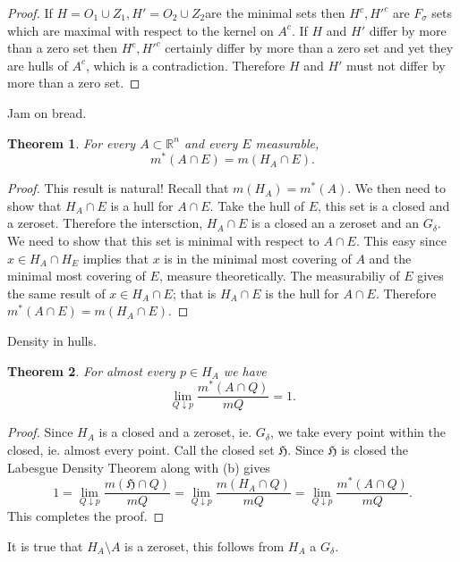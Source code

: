 \documentclass[letter]{article}
\newtheorem{theorem}{Theorem}
\newenvironment{menumerate}{%
  \edef\backupindent{\the\parindent}%
  \enumerate%
  \setlength{\parindent}{\backupindent}%
}{\endenumerate}
\begin{document}
\begin{menumerate}
\begin{menumerate}
\begin{proof}
			If $H = O_1 \cup Z_1, H' = O_2 \cup Z_2$are the minimal sets then $H^c, {H'}^c$ are $F_\sigma$ sets which are maximal with respect to the kernel on $A^c$.  If $H$ and $H'$ differ by more than a zero set then $H^c, {H'}^c$ certainly differ by more than a zero set and yet they are hulls of $A^c$, which is a contradiction. Therefore $H$ and $H'$ must not differ by more than a zero set.
		\end{proof}
		\item Jam on bread.
		\begin{theorem}
			For every $A  \subset \mathbb{R}^n$ and every $E$ measurable,
			\begin{equation}
			 	m^*(A \cap E) = m(H_A \cap E).
			 \end{equation} 
		\end{theorem}
		\begin{proof}
			This result is natural! Recall that $m(H_A) = m^*(A).$ We then need to show that $H_A \cap E$ is a hull for $A \cap E.$
			Take the hull of $E$, this set is a closed and a zeroset. 
			Therefore the intersction, $H_A \cap E$ is a closed an a zeroset and an $G_\delta.$ We need to show that this set is minimal with respect to $A \cap E.$ This easy since $x\in H_A \cap H_E$ implies that $x$ is in the minimal most covering of $A$ and the minimal most covering of $E$, measure theoretically. The measurabiliy of $E$ gives the same result of $x \in H_A \cap E$;
			that is $H_A \cap E$ is the hull for $A \cap E$. Therefore
			$m^*(A \cap E) = m(H_A \cap E).$
		\end{proof}
		\item Density in hulls.
		\begin{theorem}
			For almost every $p \in H_A$ we have
			\begin{equation}
				\lim_{Q \downarrow p} \frac{m^*(A \cap Q)}{mQ} = 1.		
			\end{equation}	
		\end{theorem}
		\begin{proof}
			Since $H_A$ is a closed and a zeroset, ie. $G_\delta$, we take every point within the closed, ie. almost every point. Call the closed set $\mathfrak{H}$.
			Since $\mathfrak{H}$ is closed the Labesgue Density Theorem along with (b) gives
			\begin{equation}
				1= \lim_{Q \downarrow p} \frac{m(\mathfrak{H} \cap Q)}{mQ} =
				\lim_{Q \downarrow p} \frac{m(H_A\cap Q)}{mQ} =
				\lim_{Q \downarrow p} \frac{m^*(A \cap Q)}{mQ}.
			\end{equation}
			This completes the proof.
		\end{proof}
	\end{menumerate}
	\item It is true that $H_A \setminus A$ is a zeroset, this follows from $H_A$ a $G_\delta$.
	

\end{menumerate}
\end{document}
